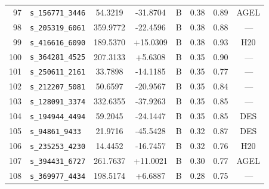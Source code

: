 \begin{longtable}{rlcccccc}
97 & \texttt{s\_156771\_3446} & 54.3219 & -31.8704 & B & 0.38 & 0.89 & AGEL \\
98 & \texttt{s\_205319\_6061} & 359.9772 & -22.4596 & B & 0.38 & 0.88 & \,--- \\
99 & \texttt{s\_416616\_6090} & 189.5370 & +15.0309 & B & 0.38 & 0.93 & H20 \\
100 & \texttt{s\_364281\_4525} & 207.3133 & +5.6308 & B & 0.35 & 0.90 & \,--- \\
101 & \texttt{s\_250611\_2161} & 33.7898 & -14.1185 & B & 0.35 & 0.77 & \,--- \\
102 & \texttt{s\_212207\_5081} & 50.6597 & -20.9567 & B & 0.35 & 0.84 & \,--- \\
103 & \texttt{s\_128091\_3374} & 332.6355 & -37.9263 & B & 0.35 & 0.85 & \,--- \\
104 & \texttt{s\_194944\_4494} & 59.2045 & -24.1447 & B & 0.35 & 0.85 & DES \\
105 & \texttt{s\_94861\_9433} & 21.9716 & -45.5428 & B & 0.32 & 0.87 & DES \\
106 & \texttt{s\_235253\_4230} & 14.4452 & -16.7457 & B & 0.32 & 0.76 & H20 \\
107 & \texttt{s\_394431\_6727} & 261.7637 & +11.0021 & B & 0.30 & 0.77 & AGEL \\
108 & \texttt{s\_369977\_4434} & 198.5174 & +6.6887 & B & 0.28 & 0.75 & \,--- \\
\end{longtable}
